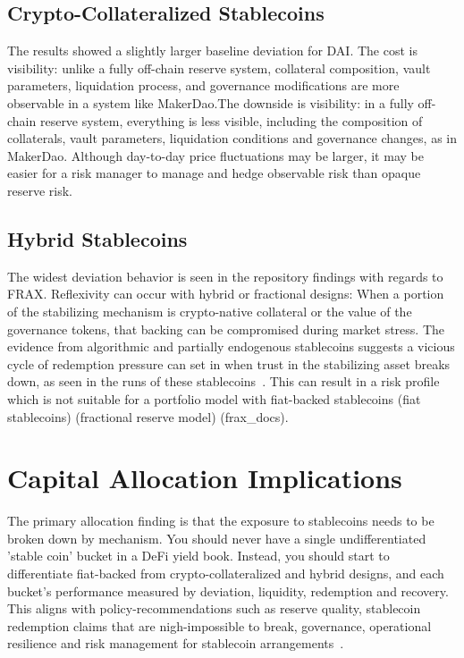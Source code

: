 \documentclass[conference]{IEEEtran}
\begin{document}
\subsection{Crypto-Collateralized Stablecoins}
The results showed a slightly larger baseline deviation for DAI. The cost is visibility: unlike a fully off-chain reserve system, collateral composition, vault parameters, liquidation process, and governance modifications are more observable in a system like MakerDao.The downside is visibility: in a fully off-chain reserve system, everything is less visible, including the composition of collaterals, vault parameters, liquidation conditions and governance changes, as in MakerDao. Although day-to-day price fluctuations may be larger, it may be easier for a risk manager to manage and hedge observable risk than opaque reserve risk.

\subsection{Hybrid Stablecoins}
The widest deviation behavior is seen in the repository findings with regards to FRAX. Reflexivity can occur with hybrid or fractional designs: When a portion of the stabilizing mechanism is crypto-native collateral or the value of the governance tokens, that backing can be compromised during market stress. The evidence from algorithmic and partially endogenous stablecoins suggests a vicious cycle of redemption pressure can set in when trust in the stabilizing asset breaks down, as seen in the runs of these stablecoins~\cite{adams_ibert_2022_runs,klages_2020_stablecoins2}. This can result in a risk profile which is not suitable for a portfolio model with fiat-backed stablecoins (fiat stablecoins) (fractional reserve model) (frax_docs).

\section{Capital Allocation Implications}
The primary allocation finding is that the exposure to stablecoins needs to be broken down by mechanism. You should never have a single undifferentiated 'stable coin' bucket in a DeFi yield book. Instead, you should start to differentiate fiat-backed from crypto-collateralized and hybrid designs, and each bucket's performance measured by deviation, liquidity, redemption and recovery. This aligns with policy-recommendations such as reserve quality, stablecoin redemption claims that are nigh-impossible to break, governance, operational resilience and risk management for stablecoin arrangements~\cite{fsb_2023_gsc,pwg_2021_stablecoins}.
\end{document}
